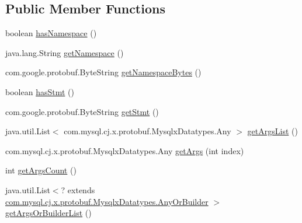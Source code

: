 \subsection*{Public Member Functions}
\begin{DoxyCompactItemize}
\item 
boolean \mbox{\hyperlink{interfacecom_1_1mysql_1_1cj_1_1x_1_1protobuf_1_1_mysqlx_sql_1_1_stmt_execute_or_builder_aaf1f5f82b6eb36eae9d468c3a92cdd8a}{has\+Namespace}} ()
\item 
java.\+lang.\+String \mbox{\hyperlink{interfacecom_1_1mysql_1_1cj_1_1x_1_1protobuf_1_1_mysqlx_sql_1_1_stmt_execute_or_builder_a1b48db07fa17e3b41cf1ab08ed472666}{get\+Namespace}} ()
\item 
com.\+google.\+protobuf.\+Byte\+String \mbox{\hyperlink{interfacecom_1_1mysql_1_1cj_1_1x_1_1protobuf_1_1_mysqlx_sql_1_1_stmt_execute_or_builder_a7282a65dafb814b39cbbfea4693017ca}{get\+Namespace\+Bytes}} ()
\item 
boolean \mbox{\hyperlink{interfacecom_1_1mysql_1_1cj_1_1x_1_1protobuf_1_1_mysqlx_sql_1_1_stmt_execute_or_builder_a212001d3effba078d4e7c74b00bbda6e}{has\+Stmt}} ()
\item 
com.\+google.\+protobuf.\+Byte\+String \mbox{\hyperlink{interfacecom_1_1mysql_1_1cj_1_1x_1_1protobuf_1_1_mysqlx_sql_1_1_stmt_execute_or_builder_a6eb8684f027282e294c1a35a91297644}{get\+Stmt}} ()
\item 
java.\+util.\+List$<$ com.\+mysql.\+cj.\+x.\+protobuf.\+Mysqlx\+Datatypes.\+Any $>$ \mbox{\hyperlink{interfacecom_1_1mysql_1_1cj_1_1x_1_1protobuf_1_1_mysqlx_sql_1_1_stmt_execute_or_builder_a494420d3475806798d4898e807394f73}{get\+Args\+List}} ()
\item 
com.\+mysql.\+cj.\+x.\+protobuf.\+Mysqlx\+Datatypes.\+Any \mbox{\hyperlink{interfacecom_1_1mysql_1_1cj_1_1x_1_1protobuf_1_1_mysqlx_sql_1_1_stmt_execute_or_builder_aa20b6613191f83fba25928bdd2a773e5}{get\+Args}} (int index)
\item 
int \mbox{\hyperlink{interfacecom_1_1mysql_1_1cj_1_1x_1_1protobuf_1_1_mysqlx_sql_1_1_stmt_execute_or_builder_ae1a9558edd6f330717e07c6e3358719b}{get\+Args\+Count}} ()
\item 
java.\+util.\+List$<$? extends \mbox{\hyperlink{interfacecom_1_1mysql_1_1cj_1_1x_1_1protobuf_1_1_mysqlx_datatypes_1_1_any_or_builder}{com.\+mysql.\+cj.\+x.\+protobuf.\+Mysqlx\+Datatypes.\+Any\+Or\+Builder}} $>$ \mbox{\hyperlink{interfacecom_1_1mysql_1_1cj_1_1x_1_1protobuf_1_1_mysqlx_sql_1_1_stmt_execute_or_builder_a48646f70170657c78dd07ef6302b77e6}{get\+Args\+Or\+Builder\+List}} ()

\end{DoxyCompactItemize}
